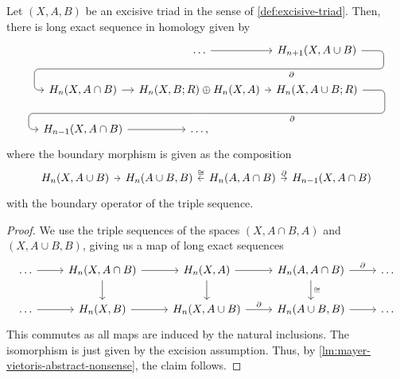 \begin{theorem}
  \label{thm:mayer-vietoris-union-intersection-of-subspaces}
  Let $(X,A,B)$ be an excisive triad in the sense of
  \autoref{def:excisive-triad}.
  Then, there is long exact sequence in homology given by
  \[
    \begin{tikzcd}[column sep = tiny]
    &
    \ldots
    \connectingmark[Y]
    \ar{r}
    &
    H_{n+1} ( X, A\cup B)
    \connectingmap[Y]{\partial}
    \\
    H_n ( X, A\cap B)
    \ar{r}
    &
    H_n ( X, B; R) \oplus H_n(X, A)
    \connectingmark[Z]
    \ar{r}
    &
    H_n ( X, A\cup B; R )
    \connectingmap[Z]{\partial}
    \\
    H_{n-1} ( X, A\cap B)
    \ar{r}
    &
    \ldots
    ,
    \end{tikzcd}
  \]
  where the boundary morphism is given as the composition
  \[
    \begin{tikzcd}[column sep = tiny]
      H_n(X,A\cup B)
      \ar{r}
      &
      H_n(A\cup B, B)
      &
      \ar[swap]{l}{\cong}
      H_n(A, A\cap B)
      \ar{r}{\partial }
      &
      H_{n-1}(X,A\cap B)
    \end{tikzcd}
  \]
  with the boundary operator of the triple sequence.
\end{theorem}

\begin{proof}
  We use the triple sequences of the spaces
  $(X,A\cap B, A)$ and $(X, A\cup B, B)$,
  giving us a map of long exact sequences
  \[
    \begin{tikzcd}
      \ldots
      \ar{r}
      &
      H_n(X, A\cap B)
      \ar{r}
      \ar{d}
      &
      H_n(X,A)
      \ar{r}
      \ar{d}
      &
      H_n(A,A\cap B)
      \ar{r}{\partial }
      \ar{d}{\cong}
      &
      \ldots
      \\
      \ldots
      \ar{r}
      &
      H_n(X,B)
      \ar{r}
      &
      H_n(X,A\cup B)
      \ar{r}{\partial }
      &
      H_n(A\cup B,B)
      \ar{r}
      &
      \ldots
    \end{tikzcd}
  \]
  This commutes as all maps are induced by the
  natural inclusions.
  The isomorphism is just given by the excision assumption.
  Thus, by
  \autoref{lm:mayer-vietoris-abstract-nonsense},
  the claim follows.
\end{proof}

